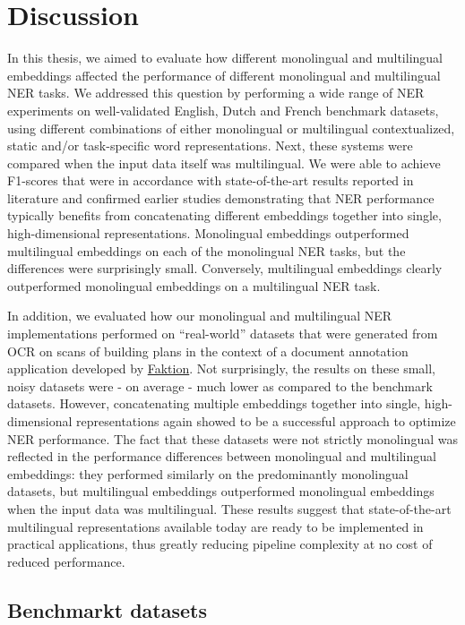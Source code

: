 \documentclass[12pt,a4paper,]{book}
\begin{document}
\hypertarget{discussion}{%
\chapter{Discussion}\label{discussion}}

In this thesis, we aimed to evaluate how different monolingual and multilingual embeddings affected the performance of different monolingual and multilingual NER tasks. We addressed this question by performing a wide range of NER experiments on well-validated English, Dutch and French benchmark datasets, using different combinations of either monolingual or multilingual contextualized, static and/or task-specific word representations. Next, these systems were compared when the input data itself was multilingual. We were able to achieve F1-scores that were in accordance with state-of-the-art results reported in literature and confirmed earlier studies demonstrating that NER performance typically benefits from concatenating different embeddings together into single, high-dimensional representations. Monolingual embeddings outperformed multilingual embeddings on each of the monolingual NER tasks, but the differences were surprisingly small. Conversely, multilingual embeddings clearly outperformed monolingual embeddings on a multilingual NER task.

In addition, we evaluated how our monolingual and multilingual NER implementations performed on ``real-world'' datasets that were generated from OCR on scans of building plans in the context of a document annotation application developed by \href{https://www.faktion.com/}{Faktion}. Not surprisingly, the results on these small, noisy datasets were - on average - much lower as compared to the benchmark datasets. However, concatenating multiple embeddings together into single, high-dimensional representations again showed to be a successful approach to optimize NER performance. The fact that these datasets were not strictly monolingual was reflected in the performance differences between monolingual and multilingual embeddings: they performed similarly on the predominantly monolingual datasets, but multilingual embeddings outperformed monolingual embeddings when the input data was multilingual. These results suggest that state-of-the-art multilingual representations available today are ready to be implemented in practical applications, thus greatly reducing pipeline complexity at no cost of reduced performance.

\hypertarget{benchmarkt-datasets}{%
\section{Benchmarkt datasets}\label{benchmarkt-datasets}}
\end{document}
